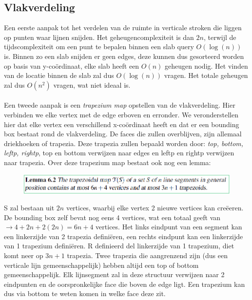 \documentclass[12pt,a4paper]{article}
\begin{document}
	\subsection{Vlakverdeling}
	Een eerste aanpak tot het verdelen van de ruimte in verticale stroken die liggen op punten waar lijnen snijden. Het geheugencomplexiteit is dan $2n$, terwijl de tijdscomplexiteit om een punt te bepalen binnen een slab query $O(\log(n))$ is. Binnen zo een slab snijden er geen edges, deze kunnen dus gesorteerd worden op basis van y-coördinaat, elke slab heeft een $O(n)$ geheugen nodig. Het vinden van de locatie binnen de slab zal dus $O(\log(n))$ vragen. Het totale geheugen zal dus $O(n^2)$ vragen, wat niet ideaal is. 
	\\
	\\
	Een tweede aanpak is een \textit{trapezium map} opstellen van de vlakverdeling. Hier verbinden we elke vertex met de edge erboven en erronder. We veronderstellen hier dat elke vertex een verschillend x-coördinaat heeft en dat er een bounding box bestaat rond de vlakverdeling. De faces die zullen overblijven, zijn allemaal driekhoeken of trapezia. Deze trapezia zullen bepaald worden door: \textit{top, bottom, leftp, rightp}, top en bottom verwijzen naar edges en leftp en rightp verwijzen naar trapezia. Over deze trapezium map bestaat ook nog een lemma: 
	\begin{figure}[H]
		\centering
		\includegraphics[width=0.9\linewidth]{afbeeldingen/trapezium-map/lemma}
		\label{fig:lemma}
	\end{figure}
	
	S zal bestaan uit $2n$ vertices, waarbij elke vertex 2 nieuwe vertices kan creëeren. De bounding box zelf bevat nog eens 4 vertices, wat een totaal geeft van $\rightarrow 4 + 2n + 2(2n) = 6n + 4$ vertices. Het links eindpunt van een segment kan een linkerzijde van 2 trapezia definiëren, een rechts eindpunt kan een linkerzijde van 1 trapezium definiëren. R definieerd del linkerzijde van 1 trapezium, diet komt neer op $3n + 1$ trapezia. Twee trapezia die aangrenzend zijn (dus een verticale lijn gemeenschappelijk) hebben altijd een top of bottom gemeenschappelijk. Elk lijnsegment zal in deze structuur verwijzen naar 2 eindpunten en de oorspronkelijke face die boven de edge ligt. Een trapezium kan dus via bottom te weten komen in welke face deze zit. 
	
\end{document}

